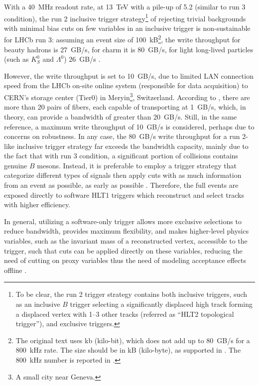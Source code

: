 With a 40~MHz readout rate,
at 13~TeV with a pile-up of 5.2 (similar to run 3 condition),
the run 2 inclusive trigger strategy\footnote{
    To be clear, the run 2 trigger strategy contains both inclusive triggers,
    such as an inclusive $B$ trigger selecting a significantly displaced high
    \pt track forming a displaced vertex with 1--3 other tracks
    (referred as ``HLT2 topological trigger''),
    and exclusive triggers.
} of rejecting trivial backgrounds with
minimal bias cuts on few variables in an inclusive trigger is non-sustainable
for LHCb run 3:
assuming an event size of 100~kB\footnote{
    The original text uses kb (kilo-bit), which does not add up to 80~GB/s for
    a 800~kHz rate.
    The size should be in kB (kilo-byte), as supported in
    \cite{CERN-LHCC-2014-016,Allen_GPU_2020}.
    The 800~kHz number is reported in \cite{LHCb-PUB-2014-027}.
},
the write throughput for beauty hadrons is 27~GB/s, for charm it is 80~GB/s,
for light long-lived particles (such as $K^0_S$ and $\Lambda^0$) 26~GB/s
\cite{Albrecht_2014}.

However,
the write throughput is set to 10~GB/s,
due to limited LAN connection speed from the LHCb on-site online
system (responsible for data acquisition) to CERN's storage center (Tier0) in
Meryin\footnote{
    A small city near Geneva.
}, Switzerland.
According to \cite{CERN-LHCC-2014-016},
there are more than 20 pairs of fibers, each capable of transporting at 1~GB/s,
which, in theory, can provide a bandwidth of greater than 20~GB/s.
Still, in the same reference, a maximum write throughput of 10~GB/s is
considered, perhaps due to concerns on robustness.
In any case, the 80~GB/s write throughput for a run 2-like inclusive trigger
strategy far exceeds the bandwidth capacity,
mainly due to the fact that with run 3 condition, a significant portion of
collisions contains genuine $B$ mesons.
Instead, it is preferable to employ a trigger strategy that categorize different
types of signals then apply cuts with as much information from an event as
possible, as early as possible
\cite{Albrecht_2014}.
Therefore, the full events are exposed directly to software HLT1 triggers which
reconstruct and select tracks with higher efficiency.

In general,
utilizing a software-only trigger allows more exclusive selections to reduce
bandwidth,
provides maximum flexibility,
and makes higher-level physics variables,
such as the invariant mass of a reconstructed vertex,
accessible to the trigger,
such that cuts can be applied directly on these variables,
reducing the need of cutting on proxy variables thus the need of modeling
acceptance effects offline \cite{Albrecht_2014}.

